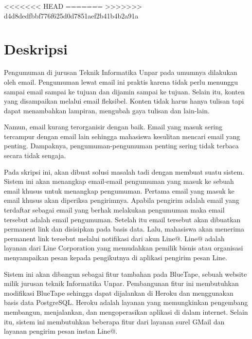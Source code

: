 \documentclass[a4paper,twoside]{article}
\begin{document}
\title{\@judultopik}
\author{\nama \textendash \@npm} 

\newcommand{\nama}{Ellena Angelica}
\newcommand{\@npm}{2015730029}
\newcommand{\@judultopik}{Kolektor Pengumuman Informatika} %
\newcommand{\jumpemb}{1} %
<<<<<<< HEAD
\newcommand{\tanggal}{04/09/2018}
=======
\newcommand{\tanggal}{01/01/1900}
>>>>>>> d4d8dedfbbf776f625d0d7851aef2b41b4b2a91a


\maketitle


\section{Deskripsi}
Pengumuman di jurusan Teknik Informatika Unpar pada umumnya dilakukan oleh email. Pengumuman lewat email ini praktis karena tidak perlu menunggu sampai email sampai ke tujuan dan dijamin sampai ke tujuan. Selain itu, konten yang disampaikan melalui email fleksibel. Konten tidak harus hanya tulisan tapi dapat menambahkan lampiran, mengubah gaya tulisan dan lain-lain.

Namun, email kurang terorganisir dengan baik. Email yang masuk sering tercampur dengan email lain sehingga mahasiswa kesulitan mencari email yang penting. Dampaknya, pengumuman-pengumuman penting sering tidak terbaca secara tidak sengaja.

Pada skripsi ini, akan dibuat solusi masalah tadi dengan membuat suatu sistem. Sistem ini akan menangkap email-email pengumuman yang masuk ke sebuah email khusus untuk menangkap pengumuman. Pertama email yang masuk ke email khusus akan diperiksa pengirimnya. Apabila pengirim adalah email yang terdaftar sebagai email yang berhak melakukan pengumuman maka email tersebut adalah email pengumuman. Setelah itu email tersebut akan dibuatkan permanent link dan disisipkan pada basis data. Lalu, mahasiswa akan menerima permanent link tersebut melalui notifikasi dari akun Line@. Line@ adalah layanan dari Line Corporation yang memudahkan pemilik bisnis atau organisasi menyampaikan pesan kepada pengikutnya di aplikasi pengirim pesan Line.

Sistem ini akan dibangun sebagai fitur tambahan pada BlueTape, sebuah website milik jurusan teknik Informatika Unpar. Pembangunan fitur ini membutuhkan modifikasi BlueTape sehingga dapat dijalankan di Heroku dan menggunakan basis data PostgreSQL. Heroku adalah layanan yang memungkinkan pengembang membangun, menjalankan, dan mengoperasikan aplikasi di dalam internet. Selain itu, sistem ini membutuhkan beberapa fitur dari layanan surel GMail dan layanan pengirim pesan instan Line@.
\end{document}
